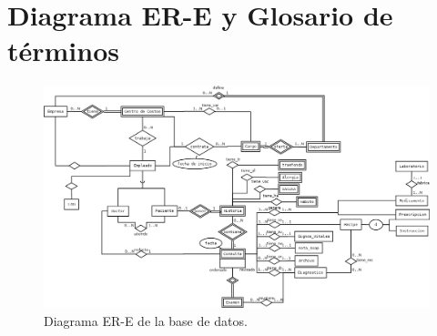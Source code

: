 \appendix

\chapter{Diagrama ER-E y Glosario de términos} \label{ere}

    
    
    \begin{figure}
        \begin{center}
            \includegraphics[scale=.4,angle=90]{figures/DiagramBD}
        \end{center}
        \caption{Diagrama ER-E de la base de datos.}
    \end{figure}

    \pagebreak